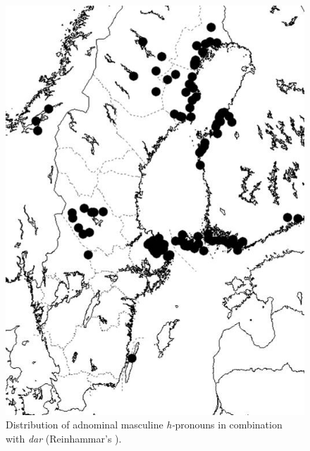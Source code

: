 \begin{figure}  
\includegraphics[height=.5\textheight]{figures/28_AdnominalmasculineDar}
\caption{Distribution of adnominal masculine \textit{h-}pronouns in combination with \textit{dar} (Reinhammar’s ).}
\label{map:24}
\end{figure}
 
